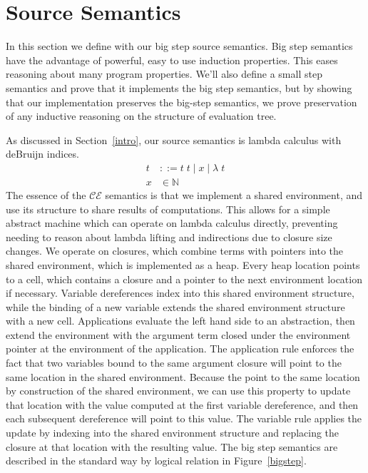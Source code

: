 \section{Source Semantics} \label{cem_big}

In this section we define with our big step source semantics. Big step semantics
have the advantage of powerful, easy to use induction properties. This eases
reasoning about many program properties. We'll also define a small step
semantics and prove that it implements the big step semantics, but by showing
that our implementation preserves the big-step semantics, we prove preservation
of any inductive reasoning on the structure of evaluation tree.  

As discussed in Section~\ref{intro}, our source semantics is lambda calculus
with deBruijn indices. 
\begin{align*}
 t &::= t \; t \; | \; x \; | \;  \lambda \; t \\
 x &\in \mathbb{N}
\end{align*}
The essence of the $\mathcal{CE}$ semantics is that we implement a shared
environment, and use its structure to share results of computations. This allows
for a simple abstract machine which can operate on lambda calculus directly,
preventing needing to reason about lambda lifting and indirections due to
closure size changes. We operate on closures, which combine terms with
pointers into the shared environment, which is implemented as a heap. Every
heap location points to a cell, which contains a closure and a pointer to the
next environment location if necessary. Variable dereferences index into this
shared environment structure, while the binding of a new variable extends the
shared environment structure with a new cell. Applications evaluate the left
hand side to an abstraction, then extend the environment with the argument term
closed under the environment pointer at the environment of the application. The
application rule enforces the fact that two variables bound to the same argument
closure will point to the same location in the shared environment. Because the
point to the same location by construction of the shared environment, we can use
this property to update that location with the value computed at the first
variable dereference, and then each subsequent dereference will point to this
value. The variable rule applies the update by indexing into the shared
environment structure and replacing the closure at that location with the
resulting value. The big step semantics are described in the standard way by
logical relation in Figure~\ref{bigstep}. 

